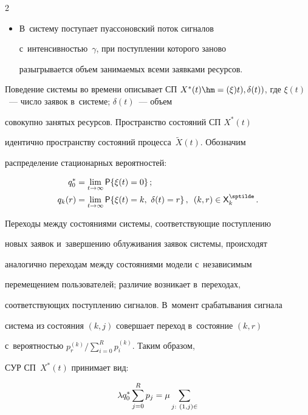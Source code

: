 \begin{multicols}{2}
\begin{itemize}
  \item[4*.] В~систему поступает пуассоновский поток сигналов 

с~интенсивностью~$\gamma$, при поступлении которого заново 

разыгрывается объем занимаемых всеми заявками ресурсов. 

\end{itemize}

  

Поведение системы во времени описывает СП $X^*(t)\hm= \left( \xi)t), 

\delta(t)\right)$, где $\xi(t)$~--- число заявок в~сис\-те\-ме; $\delta(t)$~--- объем 

совокупно занятых ресурсов. Пространство состояний СП $X^*(t)$ 

идентично пространству состояний процесса~$\tilde{X}(t)$. Обозначим 

распределение стационарных вероятностей:

\begin{align*}

q_0^* &= \lim\limits_{t\to\infty} {\sf P}\{\xi(t)=0\}\,;\\

q_k(r) &= \lim\limits_{t\to\infty} {\sf P}\{ \xi(t)=k,\ \delta(t)=r\}\,,\enskip (k,r)\in {\sf 

X}_k^{\sptilde}\,.

\end{align*}

  

  Переходы между состояниями системы, соответствующие поступлению 

новых заявок и~завершению облуживания заявок системы, происходят 

аналогично переходам между состояниями модели с~независимым 

перемещением пользователей; различие возникает в~переходах, 

соответствующих поступлению сигналов. В~момент срабатывания сигнала 

система из состояния $(k,j)$ совершает переход в~состояние $(k,r)$ 

с~вероятностью $p_r^{(k)}/\sum\nolimits_{i=0}^R p_i^{(k)}$. Таким образом, 

СУР СП~$X^*(t)$ принимает вид:

  \begin{equation}

  \lambda q_0^*\sum\limits^R_{j=0} p_j =\mu \sum\limits_{j:\ (1,j)\in{\sf 

}}
\end{equation}
\end{multicols}
